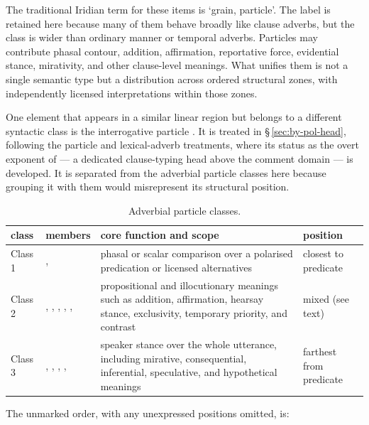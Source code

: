 The traditional Iridian term for these items is  `grain, particle'.
The label  is retained here because many of them behave
broadly like clause adverbs, but the class is wider than ordinary manner or
temporal adverbs. Particles may contribute phasal contour, addition,
affirmation, reportative force, evidential stance, mirativity, and other
clause-level meanings. What unifies them is not a single semantic type but a
distribution across ordered structural zones, with independently licensed
interpretations within those zones.

One element that appears in a similar linear region but belongs to a different
syntactic class is the interrogative particle . It is treated in
§\,\ref{sec:by-pol-head}, following the particle and lexical-adverb treatments,
where its status as the overt exponent of  —
a dedicated clause-typing head above the comment domain — is developed. It
is separated from the adverbial particle classes here because grouping it with
them would misrepresent its structural position.

\begin{table}[ht]
	\footnotesize
	\caption{Adverbial particle classes.}\label{tab:adv-particle-classes}
	\begin{tabularx}{\textwidth}{l L L l}
		\toprule
		{\sc class} & {\sc members} & {\sc core function and scope} & {\sc position} \\
		\midrule
		Class 1 &
		,  &
		phasal or scalar comparison over a polarised predication or licensed alternatives &
		closest to predicate \\
		Class 2 &
		, , , , ,  &
		propositional and illocutionary meanings such as addition, affirmation, hearsay stance, exclusivity, temporary priority, and contrast &
		mixed (see text) \\
		Class 3 &
		, , , ,  &
		speaker stance over the whole utterance, including mirative, consequential, inferential, speculative, and hypothetical meanings &
		farthest from predicate \\
		\bottomrule
	\end{tabularx}
\end{table}

The unmarked order, with any unexpressed positions omitted, is:

\pex
\a {}
\xe

